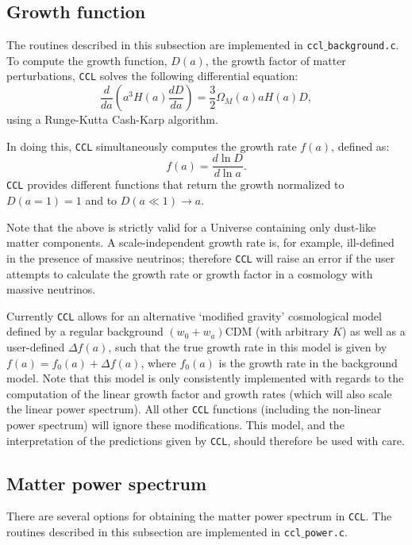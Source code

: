 \documentclass[\docopts]{\docclass}
\newcommand{\ccl}{{\tt CCL}\xspace}
\begin{document}
\subsection{Growth function}
\label{sec:growth}

The routines described in this subsection are implemented in {\tt ccl$\_$background.c}.
To compute the growth function, $D(a)$, the growth factor of matter perturbations, \ccl solves the following differential equation:
\begin{equation}
  \frac{d}{da}\left(a^3H(a)\frac{dD}{da}\right)=\frac{3}{2}\Omega_M(a)aH(a)D,
\end{equation}
using a Runge-Kutta Cash-Karp algorithm.

In doing this, \ccl simultaneously computes the growth rate $f(a)$, defined as:
\begin{equation}
  f(a)=\frac{d\ln D}{d\ln a}.
\end{equation}
\ccl provides different functions that return the growth normalized to $D(a=1)=1$ and to $D(a\ll1)\rightarrow a$.

Note that the above is strictly valid for a Universe containing only dust-like matter components. A scale-independent growth rate is, for example, ill-defined in the presence of massive neutrinos; therefore \ccl will raise an error if the user attempts to calculate the growth rate or growth factor in a cosmology with massive neutrinos.

Currently \ccl allows for an alternative `modified gravity' cosmological model defined by a regular background $(w_0+w_a)$CDM (with arbitrary $K$) as well as a user-defined $\Delta f(a)$, such that the true growth rate in this model is given by $f(a)=f_0(a)+\Delta f(a)$, where $f_0(a)$ is the growth rate in the background model. Note that this model is only consistently implemented with regards to the computation of the linear growth factor and growth rates (which will also scale the linear power spectrum). All other \ccl functions (including the non-linear power spectrum) will ignore these modifications. This model, and the interpretation of the predictions given by \ccl, should therefore be used with care.

\subsection{Matter power spectrum}
\label{sec:power}

There are several options for obtaining the matter power spectrum in \ccl.
The routines described in this subsection are implemented in {\tt ccl$\_$power.c}.
\end{document}
